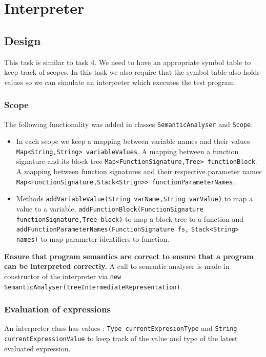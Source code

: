\chapter{Interpreter}
\label{sec:interpreter design}
\section{Design}
This task is similar to task 4. We need to have an appropriate symbol table to keep track of scopes. In this task we also require that the symbol table also holds values so we can  simulate an interpreter which executes the test program.


\subsection{Scope}
The following functionality was added in classes \verb!SemanticAnalyser! and \verb!Scope!.
\begin{itemize}
    \item In each scope we keep a mapping between variable names and their values \verb!Map<String,String> variableValues!. A mapping between a function signature and its block tree \verb!Map<FunctionSignature,Tree> functionBlock!. A mapping between function signatures and their respective parameter names \verb!Map<FunctionSignature,Stack<Strign>> functionParameterNames!.
   
    \item  Methods \verb!addVariableValue(String varName,String varValue)! to map a value to a variable, \verb!addFunctionBlock(FunctionSignature functionSignature,Tree block)! to map a block tree to a function and \verb!addFunctionParameterNames(FunctionSignature fs,!
    \verb!Stack<String> names)! to map parameter identifiers to function.
\end{itemize}

\textbf{
Ensure that program semantics are correct  to ensure that a program can be interpreted correctly.} A call to semantic analyser is made in constructor of the interpreter via \verb!new SemanticAnalyser(treeIntermediateRepresentation)!.



\subsection{Evaluation of expressions}
An interpreter class has values : \verb!Type currentExpresionType! and \verb!String currentExpressionValue! to keep track of the value and type of the latest evaluated expression.

